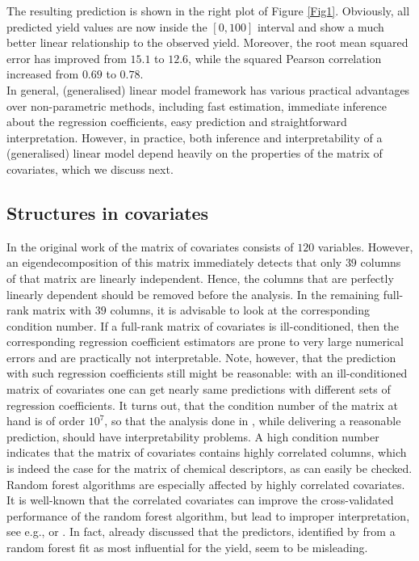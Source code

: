 \documentclass[12pt]{article}
\begin{document}
The resulting prediction is shown in the right plot of Figure \ref{Fig1}. Obviously, all predicted yield values are now inside the $[0,100]$ interval and show a much better linear relationship to the observed yield. Moreover, the root mean squared error has improved from $15.1$ to $12.6$, while the squared Pearson correlation increased from $0.69$ to $0.78$. \\
In general, (generalised) linear model framework has various practical advantages over non-parametric methods, including fast estimation, immediate inference about the regression coefficients, easy prediction and straightforward interpretation. However, in practice, both inference and  interpretability of a (generalised) linear model depend heavily on the properties of the matrix of covariates, which we discuss next. 
\subsection{Structures in covariates}
\label{subsec:covariates}
In the original work of \citet{Ahneman2018} the matrix of covariates consists of $120$ variables. However, an eigendecomposition of this matrix immediately detects that only $39$ columns of that matrix are linearly independent. Hence, the columns that are perfectly linearly dependent should be removed before the analysis. In the remaining full-rank matrix with $39$ columns, it is advisable to look at the corresponding condition number. If a full-rank matrix of covariates is ill-conditioned, then the corresponding regression coefficient estimators are prone to very large numerical errors and are practically not interpretable. Note, however, that the prediction with such regression coefficients still might be reasonable: with an ill-conditioned matrix of covariates one can get nearly same predictions with different sets of regression coefficients. It turns out, that the condition number of the matrix at hand is of order $10^{7}$, so that the analysis done in \citet{Ahneman2018}, while delivering a reasonable prediction, should have interpretability problems. A high condition number indicates that the matrix of covariates contains highly correlated columns, which is indeed the case for the matrix of chemical descriptors, as can easily be checked. Random forest algorithms are especially affected by highly correlated covariates. It is well-known that the correlated covariates can improve the cross-validated performance of the random forest algorithm, but lead to improper interpretation, see e.g., \citet{10.1093/bioinformatics/btr300} or \citet{Gregorutti2017}. In fact, \citet{Chuang2018} already discussed that the predictors, identified by \citet{Ahneman2018} from a random forest fit as most influential for the yield, seem to be misleading. \\
\end{document}

